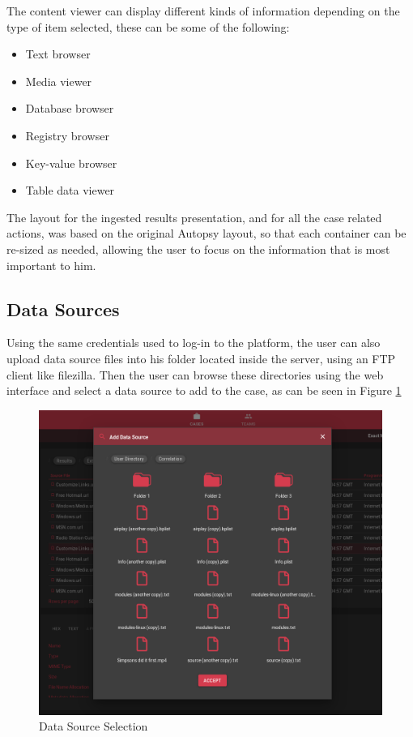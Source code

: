 The content viewer can display different kinds of information depending on the type of item selected, these can be some of the following:
\begin{itemize}
 \item Text browser
 \item Media viewer
 \item Database browser
 \item Registry browser
 \item Key-value browser
 \item Table data viewer
\end{itemize}

The layout for the ingested results presentation, and for all the case related actions, was based on the original Autopsy layout, so that each container can be re-sized as
needed, allowing the user to focus on the information that is most important to him.

\subsection{Data Sources}

Using the same credentials used to log-in to the platform, the user can also upload data source files into his folder located inside the server, using an FTP client like filezilla.
Then the user can browse these directories using the web interface and select a data source to add to the case, as can be seen in Figure \ref{fig:datasource}

\begin{figure}[h]
 \centering
 \includegraphics[width=0.85\linewidth]{imgs/data-sources.png}
 \caption{Data Source Selection}
 \label{fig:datasource}
\end{figure}

